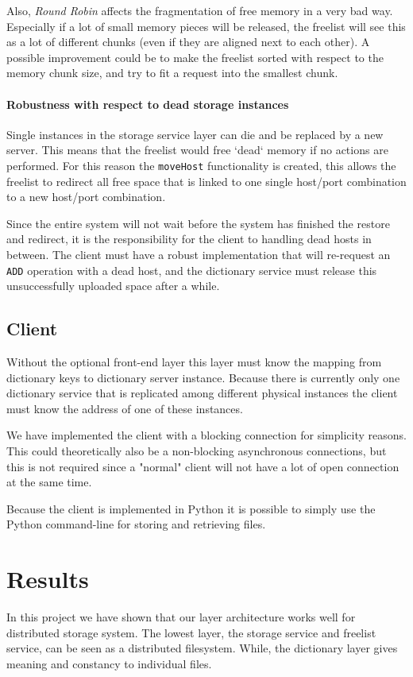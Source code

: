 \documentclass[12pt,a4paper]{scrartcl}
\begin{document}
Also, \emph{Round Robin} affects the fragmentation of free memory in a very bad way. Especially if a lot of small memory pieces will be released, the freelist will see this as a lot of different chunks (even if they are aligned next to each other). A possible improvement could be to make the freelist sorted with respect to the memory chunk size, and try to fit a request into the smallest chunk.

\paragraph{Robustness with respect to dead storage instances}
Single instances in the storage service layer can die and be replaced by a new server. This means that the freelist would free `dead` memory if no actions are performed. For this reason the \verb|moveHost| functionality is created, this allows the freelist to redirect all free space that is linked to one single host/port combination to a new host/port combination.

Since the entire system will not wait before the system has finished the restore and redirect, it is the responsibility for the client to handling dead hosts in between. The client must have a robust implementation that will re-request an \verb|ADD| operation with a dead host, and the dictionary service must release this unsuccessfully uploaded space after a while.

\subsection{Client}
Without the optional front-end layer this layer must know the mapping from dictionary keys to dictionary server instance. Because there is currently only one dictionary service that is replicated among different physical instances the client must know the address of one of these instances.

We have implemented the client with a blocking connection for simplicity reasons. This could theoretically also be a non-blocking asynchronous connections, but this is not required since a "normal" client will not have a lot of open connection at the same time.

Because the client is implemented in Python it is possible to simply use the Python command-line for storing and retrieving files.

\section{Results}
In this project we have shown that our layer architecture works well for distributed storage system. The lowest layer, the storage service and freelist service, can be seen as a distributed filesystem. While, the dictionary layer gives meaning and constancy to individual files.
\end{document}

